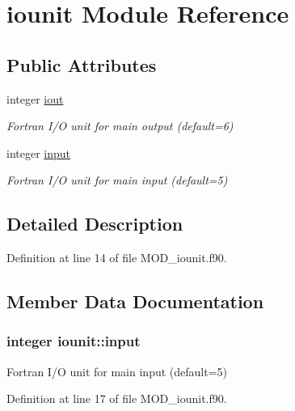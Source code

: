 \hypertarget{classiounit}{\section{iounit Module Reference}
\label{classiounit}
}
\subsection*{Public Attributes}
\begin{DoxyCompactItemize}
\item 
integer \hyperlink{classiounit_aa6ee53105beac2f5fedaa08cfccac217}{iout}
\begin{DoxyCompactList}\small\item\em Fortran I/\-O unit for main output (default=6) \end{DoxyCompactList}\item 
integer \hyperlink{classiounit_a6b433944ae82980f01c6a2d51ae9cef5}{input}
\begin{DoxyCompactList}\small\item\em Fortran I/\-O unit for main input (default=5) \end{DoxyCompactList}\end{DoxyCompactItemize}


\subsection{Detailed Description}


Definition at line 14 of file M\-O\-D\-\_\-iounit.\-f90.



\subsection{Member Data Documentation}
\hypertarget{classiounit_a6b433944ae82980f01c6a2d51ae9cef5}{
\subsubsection[{input}]{\setlength{\rightskip}{0pt plus 5cm}integer iounit\-::input}}\label{classiounit_a6b433944ae82980f01c6a2d51ae9cef5}


Fortran I/\-O unit for main input (default=5) 



Definition at line 17 of file M\-O\-D\-\_\-iounit.\-f90.

